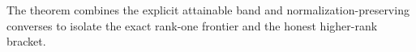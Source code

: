 The theorem combines the explicit attainable band and normalization-preserving converses to isolate the exact rank-one frontier and the honest higher-rank bracket.